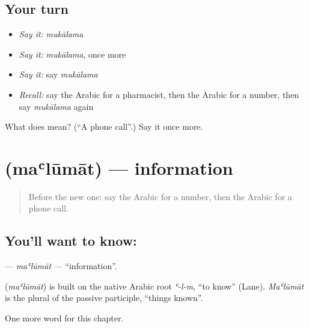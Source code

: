 \subsection*{Your turn}
\begin{itemize}
\raggedright
  \item \emph{Say it:} \emph{mukālama}
  \item \emph{Say it:} \emph{mukālama}, once more
  \item \emph{Say it:} say \emph{mukālama}
  \item \emph{Recall:} say the Arabic for a pharmacist, then the Arabic for a number, then say \emph{mukālama} again
\end{itemize}

\begin{tcolorbox}[breakable,colback=teal!4,colframe=teal!35!black,title={Before you move on}]
What does  mean? (\textquotedblleft{}A phone call\textquotedblright{}.) Say it once more.
\end{tcolorbox}
\section[\texorpdfstring{\ar{معلومات} (maʿlūmāt)}{معلومات (maʿlūmāt)}]{ (maʿlūmāt) — information}

\label{lesson:AR-C281-malumat}



\begin{quote}
Before the new one: say the Arabic for a number, then the Arabic for a phone call.
\end{quote}

\subsection*{You'll want to know: }
\textbf{} — \emph{maʿlūmāt} — \textquotedblleft{}information\textquotedblright{}.

\begin{cousinweb}
\textbf{} (\emph{maʿlūmāt}) is built on the native Arabic root \emph{ʿ-l-m}, \textquotedblleft{}to know\textquotedblright{} (Lane). \emph{Maʿlūmāt} is the plural of the passive participle, \textquotedblleft{}things known\textquotedblright{}.
\end{cousinweb}

\begin{grammarlens}[title={What you've built}]
One more word for this chapter.
\end{grammarlens}

